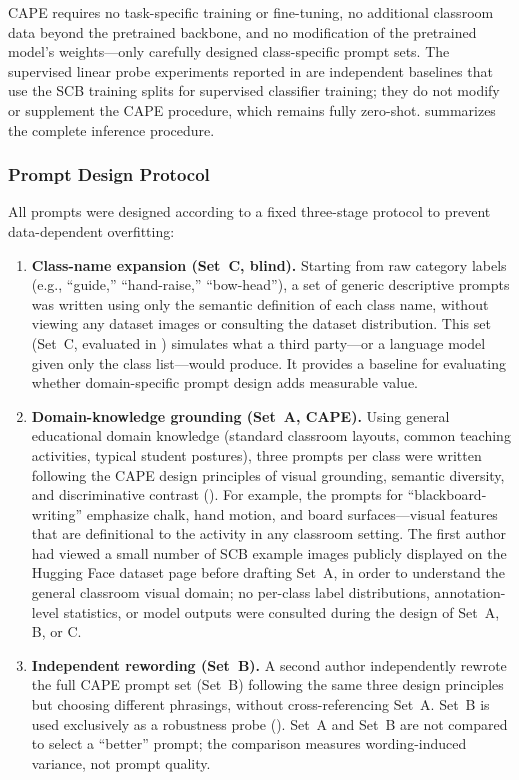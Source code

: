 \documentclass[symmetry,article,submit,pdftex,moreauthors]{Definitions/mdpi}
\begin{document}
CAPE requires no task-specific training or fine-tuning, no additional classroom data beyond the pretrained backbone, and no modification of the pretrained model's weights---only carefully designed class-specific prompt sets.
The supervised linear probe experiments reported in  are independent baselines that use the SCB training splits for supervised classifier training; they do not modify or supplement the CAPE procedure, which remains fully zero-shot.
 summarizes the complete inference procedure.

\subsubsection{Prompt Design Protocol}
\label{sec:prompt_protocol}

All prompts were designed according to a fixed three-stage protocol to prevent data-dependent overfitting:

\begin{enumerate}
    \item \textbf{Class-name expansion (Set~C, blind).} Starting from raw category labels (e.g., ``guide,'' ``hand-raise,'' ``bow-head''), a set of generic descriptive prompts was written using only the semantic definition of each class name, without viewing any dataset images or consulting the dataset distribution. This set (Set~C, evaluated in ) simulates what a third party---or a language model given only the class list---would produce. It provides a baseline for evaluating whether domain-specific prompt design adds measurable value.
    \item \textbf{Domain-knowledge grounding (Set~A, CAPE).} Using general educational domain knowledge (standard classroom layouts, common teaching activities, typical student postures), three prompts per class were written following the CAPE design principles of visual grounding, semantic diversity, and discriminative contrast (). For example, the prompts for ``blackboard-writing'' emphasize chalk, hand motion, and board surfaces---visual features that are definitional to the activity in any classroom setting. The first author had viewed a small number of SCB example images publicly displayed on the Hugging Face dataset page before drafting Set~A, in order to understand the general classroom visual domain; no per-class label distributions, annotation-level statistics, or model outputs were consulted during the design of Set~A, B, or C.
    \item \textbf{Independent rewording (Set~B).} A second author independently rewrote the full CAPE prompt set (Set~B) following the same three design principles but choosing different phrasings, without cross-referencing Set~A. Set~B is used exclusively as a robustness probe (). Set~A and Set~B are not compared to select a ``better'' prompt; the comparison measures wording-induced variance, not prompt quality.
\end{enumerate}
\end{document}
